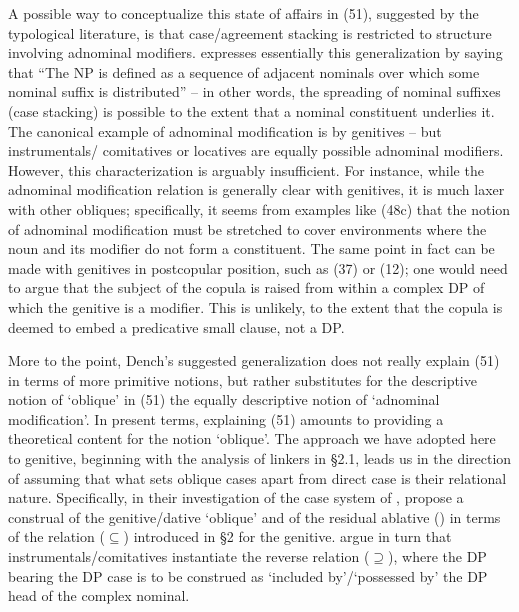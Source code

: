 \documentclass[output=paper]{langsci/langscibook}
\begin{document}
A possible way to conceptualize this state of affairs in (51), suggested by the typological literature, is that case\slash agreement stacking is restricted to structure involving adnominal modifiers. \citet[386]{Dench1995} expresses essentially this generalization by saying that “The NP is defined as a sequence of adjacent nominals over which some nominal suffix is distributed” – in other words, the spreading of nominal suffixes (case stacking) is possible to the extent that a nominal constituent underlies it. The canonical example of adnominal modification is by genitives – but instrumentals/ comitatives or locatives are equally possible adnominal modifiers. However, this characterization is arguably insufficient. For instance, while the adnominal modification relation is generally clear with genitives, it is much laxer with other obliques; specifically, it seems from examples like (48c) that the notion of adnominal modification must be stretched to cover environments where the noun and its modifier do not form a constituent. The same point in fact can be made with genitives in postcopular position, such as  (37) or  (12); one would need to argue that the subject of the copula is raised from within a complex DP of which the genitive is a modifier. This is unlikely, to the extent that the copula is deemed to embed a predicative small clause, not a DP.

More to the point, Dench’s suggested generalization does not really explain (51) in terms of more primitive notions, but rather substitutes for the descriptive notion of ‘oblique’ in (51) the equally descriptive notion of ‘adnominal modification’. In present terms, explaining (51) amounts to providing a theoretical content for the notion ‘oblique’. The approach we have adopted here to genitive, beginning with the analysis of  linkers in §2.1, leads us in the direction of assuming that what sets oblique cases apart from direct case is their relational nature. Specifically, in their investigation of the case system of , \citet{Manzini2011Grammatical,Manzini2011Reducing} propose a construal of the genitive\slash {}dative  ‘oblique’ and of the residual ablative () in terms of the relation ($\subseteq$) introduced in §2 for the genitive. \citet{Franco2015} argue in turn that instrumentals\slash comitatives instantiate the reverse relation ($\supseteq$), where the DP bearing the DP case is to be construed as ‘included by’/‘possessed by’ the DP head of the complex nominal. 
\end{document}
